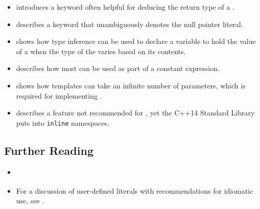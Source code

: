 \begin{itemize}
\item{introduces a keyword often helpful for deducing the return type of a .}
\item{describes a keyword that unambiguously denotes the null pointer literal.}
\item{ shows how type inference can be used to declare a variable to hold the value of a  when the type of the  varies based on its contents.}
\item{describes how most  can be used as part of a constant expression.}
\item{shows how templates can take an infinite number of parameters, which is required for implementing .}
\item{describes a feature not recommended for , yet the C++14 Standard Library puts  into \lstinline!inline! namespaces.}
\end{itemize}

\subsection[Further Reading]{Further Reading}\label{further-reading}

\begin{itemize}
\item{\cite{mcintosh08}}
\item{For a discussion of user-defined literals with recommendations for idiomatic use, see \cite{dewhurst19}.}
\end{itemize}


